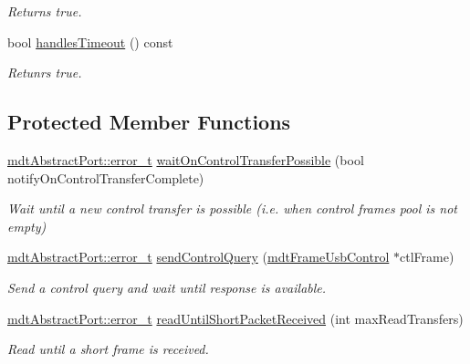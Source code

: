 \begin{DoxyCompactItemize}
\begin{DoxyCompactList}\small\item\em Returns true. \end{DoxyCompactList}\item 
\hypertarget{classmdt_usb_port_thread_aeaa2dabc53e57f6b7cf7077d113c7f40}{
bool \hyperlink{classmdt_usb_port_thread_aeaa2dabc53e57f6b7cf7077d113c7f40}{handlesTimeout} () const }
\label{classmdt_usb_port_thread_aeaa2dabc53e57f6b7cf7077d113c7f40}

\begin{DoxyCompactList}\small\item\em Retunrs true. \end{DoxyCompactList}\end{DoxyCompactItemize}
\subsection*{Protected Member Functions}
\begin{DoxyCompactItemize}
\item 
\hyperlink{classmdt_abstract_port_ad4121bb930c95887e77f8bafa065a85e}{mdtAbstractPort::error\_\-t} \hyperlink{classmdt_usb_port_thread_a2d234f3900b502ecced6897facdcf029}{waitOnControlTransferPossible} (bool notifyOnControlTransferComplete)
\begin{DoxyCompactList}\small\item\em Wait until a new control transfer is possible (i.e. when control frames pool is not empty) \end{DoxyCompactList}\item 
\hyperlink{classmdt_abstract_port_ad4121bb930c95887e77f8bafa065a85e}{mdtAbstractPort::error\_\-t} \hyperlink{classmdt_usb_port_thread_ae154415b3f311b02934405cd58eb9aa5}{sendControlQuery} (\hyperlink{classmdt_frame_usb_control}{mdtFrameUsbControl} $\ast$ctlFrame)
\begin{DoxyCompactList}\small\item\em Send a control query and wait until response is available. \end{DoxyCompactList}\item 
\hyperlink{classmdt_abstract_port_ad4121bb930c95887e77f8bafa065a85e}{mdtAbstractPort::error\_\-t} \hyperlink{classmdt_usb_port_thread_acca2af9704cc6894ec5b2058ca102af1}{readUntilShortPacketReceived} (int maxReadTransfers)
\begin{DoxyCompactList}\small\item\em Read until a short frame is received. \end{DoxyCompactList}\end{DoxyCompactItemize}


